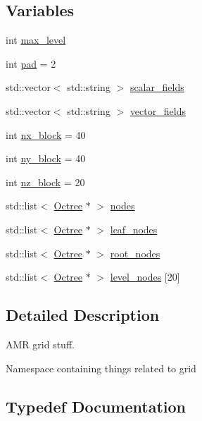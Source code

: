 \subsection*{Variables}
\begin{DoxyCompactItemize}
\item 
int \hyperlink{namespacemy_octree_ae2a304436a1b08f28c93d8e54026c8bb}{max\+\_\+level}
\item 
int \hyperlink{namespacemy_octree_afd8ca344b4ea11a79b6154184cdd1eee}{pad} = 2
\item 
std\+::vector$<$ std\+::string $>$ \hyperlink{namespacemy_octree_a4f17c285302d88a975d981d6d3847e0b}{scalar\+\_\+fields}
\item 
std\+::vector$<$ std\+::string $>$ \hyperlink{namespacemy_octree_a2945780283d74e740bfa857e95f7c19a}{vector\+\_\+fields}
\item 
int \hyperlink{namespacemy_octree_a7f30e98430213a41919e16e40abc2078}{nx\+\_\+block} = 40
\item 
int \hyperlink{namespacemy_octree_a39784fe68930da363b3ad335a47bed19}{ny\+\_\+block} = 40
\item 
int \hyperlink{namespacemy_octree_a2b2fa3a7759c3ff5b129847af3e09cc3}{nz\+\_\+block} = 20
\item 
std\+::list$<$ \hyperlink{classmy_octree_1_1_octree}{Octree} $\ast$ $>$ \hyperlink{namespacemy_octree_a8c21e6b5a77ff973d7422aeb09230f2d}{nodes}
\item 
std\+::list$<$ \hyperlink{classmy_octree_1_1_octree}{Octree} $\ast$ $>$ \hyperlink{namespacemy_octree_ab0c724b7056ad36edd2acde8443dae7a}{leaf\+\_\+nodes}
\item 
std\+::list$<$ \hyperlink{classmy_octree_1_1_octree}{Octree} $\ast$ $>$ \hyperlink{namespacemy_octree_a6212186e66a32f5588c044d5ba02dabf}{root\+\_\+nodes}
\item 
std\+::list$<$ \hyperlink{classmy_octree_1_1_octree}{Octree} $\ast$ $>$ \hyperlink{namespacemy_octree_ab896d4170dc937b1579cab36f7aa8015}{level\+\_\+nodes} \mbox{[}20\mbox{]}
\end{DoxyCompactItemize}


\subsection{Detailed Description}
A\+M\+R grid stuff. 

Namespace containing things related to grid 

\subsection{Typedef Documentation}
\hypertarget{namespacemy_octree_a4895f593ecb4b9b86353c728c62fff97}{}
